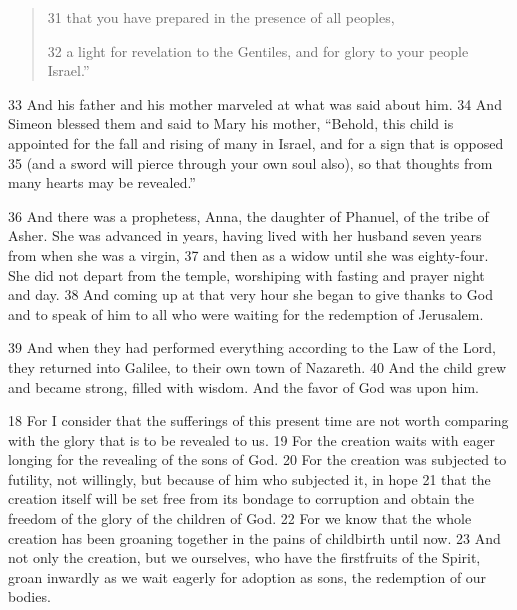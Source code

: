 \begin{bible}
\begin{quote}
31 that you have prepared in the presence of all peoples,

32 a light for revelation to the Gentiles, and for glory to your people Israel.''
\end{quote}

33 And his father and his mother marveled at what was said about him. 34 And Simeon blessed them and said to Mary his mother, ``Behold, this child is appointed for the fall and rising of many in Israel, and for a sign that is opposed 35 (and a sword will pierce through your own soul also), so that thoughts from many hearts may be revealed.''

36 And there was a prophetess, Anna, the daughter of Phanuel, of the tribe of Asher. She was advanced in years, having lived with her husband seven years from when she was a virgin, 37 and then as a widow until she was eighty-four. She did not depart from the temple, worshiping with fasting and prayer night and day. 38 And coming up at that very hour she began to give thanks to God and to speak of him to all who were waiting for the redemption of Jerusalem.

39 And when they had performed everything according to the Law of the Lord, they returned into Galilee, to their own town of Nazareth. 40 And the child grew and became strong, filled with wisdom. And the favor of God was upon him.


18 For I consider that the sufferings of this present time are not worth comparing with the glory that is to be revealed to us. 19 For the creation waits with eager longing for the revealing of the sons of God. 20 For the creation was subjected to futility, not willingly, but because of him who subjected it, in hope 21 that the creation itself will be set free from its bondage to corruption and obtain the freedom of the glory of the children of God. 22 For we know that the whole creation has been groaning together in the pains of childbirth until now. 23 And not only the creation, but we ourselves, who have the firstfruits of the Spirit, groan inwardly as we wait eagerly for adoption as sons, the redemption of our bodies.

\end{bible}

